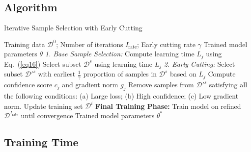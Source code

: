 \subsection{Algorithm}
\label{appendix:B}

\begin{algorithm}[h]
\caption{Iterative Sample Selection with Early Cutting}\label{alg:proposed_method}
\begin{algorithmic}[1]
\REQUIRE Training data $\mathcal{D}^0$; Number of iterations $I_{\text{rate}}$; Early cutting rate $\gamma$
\ENSURE Trained model parameters $\theta$
    \STATE \emph{1. Base Sample Selection:}
        \STATE Compute learning time $L_j$ using Eq.~(\ref{eq16})
        \STATE Select subset $\mathcal{D}^s$ using learning time $L_j$
    \ENDFOR
    \STATE \emph{2. Early Cutting:}
        \STATE Select subset $\mathcal{D'}^s$ with earliest $\frac{1}{\gamma}$ proportion of samples in $\mathcal{D}^s$ based on $L_j$
        \STATE Compute confidence score $c_j$ and gradient norm $g_j$
        \STATE Remove samples from $\mathcal{D'}^s$ satisfying all the following conditions:
        \STATE \quad (a) Large loss; (b) High confidence; (c) Low gradient norm.
        \STATE Update training set $\mathcal{D}^{i}$
    \ENDFOR
\ENDFOR
\STATE \textbf{Final Training Phase:} Train model on refined $\mathcal{D}^{I_{\text{rate}}}$ until convergence
\RETURN Trained model parameters $\theta^*$
\end{algorithmic}
\end{algorithm}

\subsection{Training Time}
\label{appb7}
\begin{table*}[h]
\renewcommand{\arraystretch}{1.0}
\centering
	\caption{A comparison of training hours for ResNet-34 on CIFAR-100 (Tested on servers with a single RTX 4090 GPU)}
	\label{tab7}
\end{table*}


